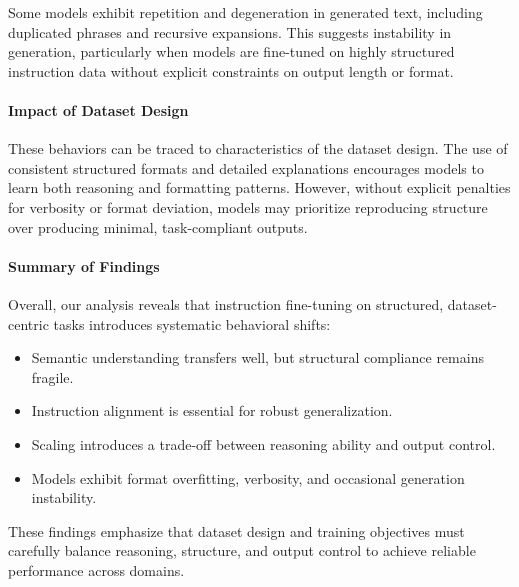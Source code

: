 \documentclass[a4paper,fleqn]{cas-sc}
\begin{document}
Some models exhibit repetition and degeneration in generated text, including duplicated phrases and recursive expansions. This suggests instability in generation, particularly when models are fine-tuned on highly structured instruction data without explicit constraints on output length or format.

\paragraph{Impact of Dataset Design}

These behaviors can be traced to characteristics of the dataset design. The use of consistent structured formats and detailed explanations encourages models to learn both reasoning and formatting patterns. However, without explicit penalties for verbosity or format deviation, models may prioritize reproducing structure over producing minimal, task-compliant outputs.

\paragraph{Summary of Findings}

Overall, our analysis reveals that instruction fine-tuning on structured, dataset-centric tasks introduces systematic behavioral shifts:

\begin{itemize}
\item Semantic understanding transfers well, but structural compliance remains fragile.
\item Instruction alignment is essential for robust generalization.
\item Scaling introduces a trade-off between reasoning ability and output control.
\item Models exhibit format overfitting, verbosity, and occasional generation instability.
\end{itemize}

These findings emphasize that dataset design and training objectives must carefully balance reasoning, structure, and output control to achieve reliable performance across domains.


\end{document}
